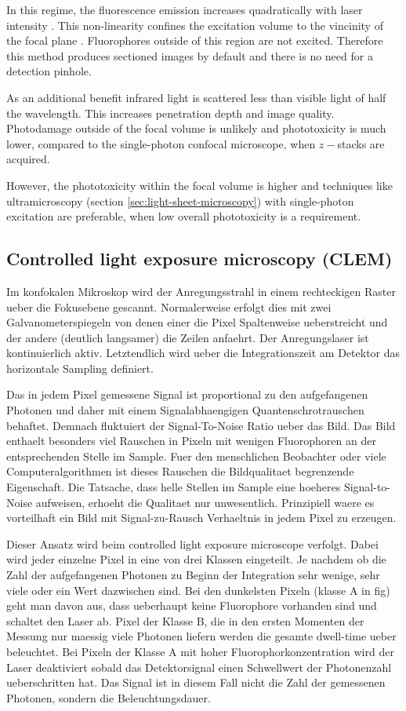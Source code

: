 In this regime, the fluorescence emission increases quadratically with
laser intensity \citep{goppert1931elementarakte}. This non-linearity
confines the excitation volume to the vincinity of the focal plane
\citep{Denk1990}. Fluorophores outside of this region are not
excited. Therefore this method produces sectioned images by default
and there is no need for a detection pinhole.

As an additional benefit infrared light is scattered less than visible
light of half the wavelength. This increases penetration depth and
image quality. Photodamage outside of the focal volume is unlikely and
phototoxicity is much lower, compared to the single-photon confocal
microscope, when $z-$stacks are acquired.

However, the phototoxicity within the focal volume is higher and
techniques like ultramicroscopy (section
\ref{sec:light-sheet-microscopy}) with single-photon excitation are
preferable, when low overall phototoxicity is a requirement.
\subsection{Controlled light exposure microscopy (CLEM)}
\label{sec:CLEM}
Im konfokalen Mikroskop wird der Anregungsstrahl in einem rechteckigen
Raster ueber die Fokusebene gescannt. Normalerweise erfolgt dies mit
zwei Galvanometerspiegeln von denen einer die Pixel Spaltenweise
ueberstreicht und der andere (deutlich langsamer) die Zeilen anfaehrt.
Der Anregungslaser ist kontinuierlich aktiv. Letztendlich wird ueber
die Integrationszeit am Detektor das horizontale Sampling definiert.

Das in jedem Pixel gemessene Signal ist proportional zu den
aufgefangenen Photonen und daher mit einem Signalabhaengigen
Quantenschrotrauschen behaftet. Demnach fluktuiert der Signal-To-Noise
Ratio ueber das Bild. Das Bild enthaelt besonders viel Rauschen in
Pixeln mit wenigen Fluorophoren an der entsprechenden Stelle im
Sample. Fuer den menschlichen Beobachter oder viele
Computeralgorithmen ist dieses Rauschen die Bildqualitaet begrenzende
Eigenschaft. Die Tatsache, dass helle Stellen im Sample eine hoeheres
Signal-to-Noise aufweisen, erhoeht die Qualitaet nur
unwesentlich. Prinzipiell waere es vorteilhaft ein Bild mit
Signal-zu-Rausch Verhaeltnis in jedem Pixel zu erzeugen.

Dieser Ansatz wird beim controlled light exposure microscope verfolgt.
Dabei wird jeder einzelne Pixel in eine von drei Klassen
eingeteilt. Je nachdem ob die Zahl der aufgefangenen Photonen zu
Beginn der Integration sehr wenige, sehr viele oder ein Wert
dazwischen sind. Bei den dunkelsten Pixeln (klasse A in fig) geht man
davon aus, dass ueberhaupt keine Fluorophore vorhanden sind und
schaltet den Laser ab. Pixel der Klasse B, die in den ersten Momenten
der Messung nur maessig viele Photonen liefern werden die gesamte
dwell-time ueber beleuchtet. Bei Pixeln der Klasse A mit hoher
Fluorophorkonzentration wird der Laser deaktiviert sobald das
Detektorsignal einen Schwellwert der Photonenzahl ueberschritten
hat. Das Signal ist in diesem Fall nicht die Zahl der gemessenen
Photonen, sondern die Beleuchtungsdauer.


